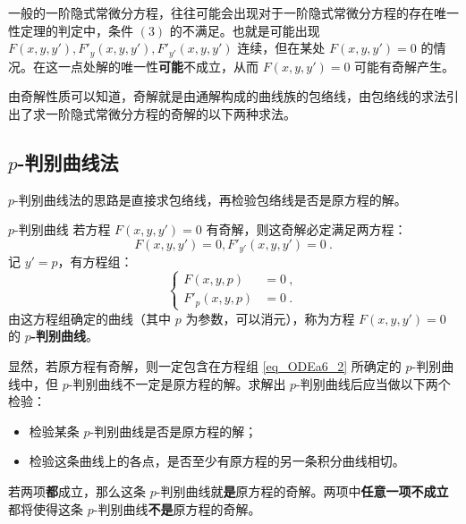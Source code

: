 
\begin{issues}
\issueDraft
\end{issues}

一般的一阶隐式常微分方程，往往可能会出现对于一阶隐式常微分方程的存在唯一性定理的判定中，条件 $(3)$ 的不满足。也就是可能出现 $F(x,y,y'), F'_y(x,y,y'), F'_{y'}(x,y,y')$ 连续，但在某处 $F(x,y,y')=0$ 的情况。在这一点处解的唯一性\textbf{可能}不成立，从而 $F(x,y,y')=0$ 可能有奇解产生。

由奇解性质可以知道，奇解就是由通解构成的曲线族的包络线，由包络线的求法引出了求一阶隐式常微分方程的奇解的以下两种求法。
\subsection{$p$-判别曲线法}\label{sub_ODEa6_1}
$p$-判别曲线法的思路是直接求包络线，再检验包络线是否是原方程的解。
\begin{definition}{$p$-判别曲线}
若方程 $F(x,y,y')=0$ 有奇解，则这奇解必定满足两方程：
\begin{equation}\label{eq_ODEa6_1}
F(x,y,y')=0, F'_{y'}(x,y,y')=0 ~.
\end{equation}
记 $y'=p$，有方程组：
\begin{equation}\label{eq_ODEa6_2}
\left \{
\begin{aligned}
F(x,y,p) &= 0~, \\
F'_{p}(x,y,p) &= 0~.
\end{aligned}
\right .
\end{equation}
由这方程组确定的曲线（其中 $p$ 为参数，可以消元），称为方程 $F(x,y,y')=0$ 的 \textbf{$p$-判别曲线}。
\end{definition}
显然，若原方程有奇解，则一定包含在方程组 \autoref{eq_ODEa6_2} 所确定的 $p$-判别曲线中，但 $p$-判别曲线不一定是原方程的解。求解出 $p$-判别曲线后应当做以下两个检验：
\begin{itemize}
\item 检验某条 $p$-判别曲线是否是原方程的解；
\item 检验这条曲线上的各点，是否至少有原方程的另一条积分曲线相切。
\end{itemize}
若两项\textbf{都}成立，那么这条 $p$-判别曲线就\textbf{是}原方程的奇解。两项中\textbf{任意一项不成立}都将使得这条 $p$-判别曲线\textbf{不是}原方程的奇解。
